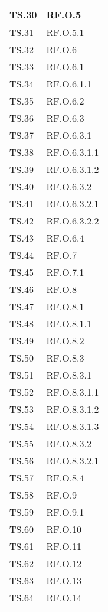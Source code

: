 {{{{{{{{{\begin{tabularx}{\textwidth}{p{}|X}
    \hline
    TS.30 & RF.O.5 \\
    \hline
    TS.31 & RF.O.5.1 \\
    \hline
    TS.32 & RF.O.6 \\
    \hline
    TS.33 & RF.O.6.1 \\
    \hline
    TS.34 & RF.O.6.1.1 \\
    \hline
    TS.35 & RF.O.6.2 \\
    \hline
    TS.36 & RF.O.6.3 \\
    \hline
    TS.37 & RF.O.6.3.1 \\
    \hline
    TS.38 & RF.O.6.3.1.1 \\
    \hline
    TS.39 & RF.O.6.3.1.2 \\
    \hline
    TS.40 & RF.O.6.3.2 \\
    \hline
    TS.41 & RF.O.6.3.2.1 \\
    \hline
    TS.42 & RF.O.6.3.2.2 \\
    \hline
    TS.43 & RF.O.6.4 \\
    \hline
    TS.44 & RF.O.7 \\
    \hline
    TS.45 & RF.O.7.1 \\
    \hline
    TS.46 & RF.O.8 \\
    \hline
    TS.47 & RF.O.8.1 \\
    \hline
    TS.48 & RF.O.8.1.1 \\
    \hline
    TS.49 & RF.O.8.2 \\
    \hline
    TS.50 & RF.O.8.3 \\
    \hline
    TS.51 & RF.O.8.3.1 \\
    \hline
    TS.52 & RF.O.8.3.1.1 \\
    \hline
    TS.53 & RF.O.8.3.1.2 \\
    \hline
    TS.54 & RF.O.8.3.1.3 \\
    \hline
    TS.55 & RF.O.8.3.2 \\
    \hline
    TS.56 & RF.O.8.3.2.1 \\
    \hline
    TS.57 & RF.O.8.4 \\
    \hline
    TS.58 & RF.O.9 \\
    \hline
    TS.59 & RF.O.9.1 \\
    \hline
    TS.60 & RF.O.10 \\
    \hline
    TS.61 & RF.O.11 \\
    \hline
    TS.62 & RF.O.12 \\
    \hline
    TS.63 & RF.O.13 \\
    \hline
    TS.64 & RF.O.14 \\

\end{tabularx}}}}}}}}}}
